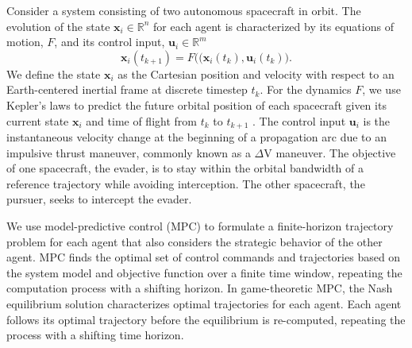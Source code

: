 Consider a system consisting of two autonomous spacecraft in orbit. The evolution of the state $\boldsymbol{x}_i \in \mathbb{R}^n$ for each agent is characterized by its equations of motion, $F$, and its control input, $\boldsymbol{u}_i \in \mathbb{R}^m$ 
% 
\begin{equation} 
    \boldsymbol{x}_i(t_{ k+1 }) = F\big( ( \boldsymbol{x}_i (t_k), \boldsymbol{u}_i(t_k) \big). 
\end{equation} 
% 
We define the state $\boldsymbol{x}_i$ as the Cartesian position and velocity with respect to an Earth-centered inertial frame at discrete timestep $t_k$.
For the dynamics $F$, we use Kepler’s laws to predict the future orbital position of each spacecraft given its current state $\boldsymbol{x}_i$ and time of flight from $t_k$ to $t_{k+1}$ \cite{sims1997preliminary}. 
The control input $\boldsymbol{u}_i$ is the instantaneous velocity change at the beginning of a propagation arc due to an impulsive thrust maneuver, commonly known as a $\Delta$V maneuver.
The objective of one spacecraft, the evader, is to stay within the orbital bandwidth of a reference trajectory while avoiding interception.
The other spacecraft, the pursuer, seeks to intercept the evader. 

We use model-predictive control (MPC) to formulate a finite-horizon trajectory problem for each agent that also considers the strategic behavior of the other agent.
MPC finds the optimal set of control commands and trajectories based on the system model and objective function over a finite time window, repeating the computation process with a shifting horizon. 
In game-theoretic MPC, the Nash equilibrium solution characterizes optimal trajectories for each agent. Each agent follows its optimal trajectory before the equilibrium is re-computed, repeating the process with a shifting time horizon. 


